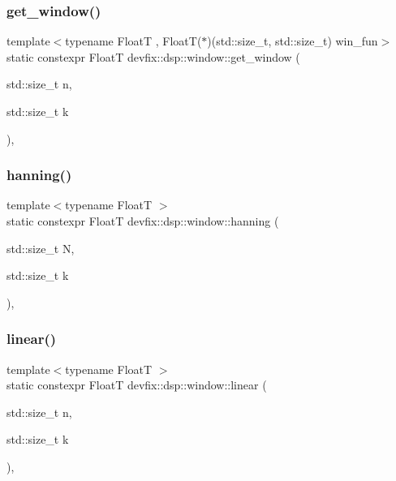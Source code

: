 \subsubsection{\texorpdfstring{get\+\_\+window()}{get\_window()}}
{\footnotesize\ttfamily template$<$typename FloatT , Float\+T($\ast$)(std\+::size\+\_\+t, std\+::size\+\_\+t) win\+\_\+fun$>$ \\
static constexpr FloatT devfix\+::dsp\+::window\+::get\+\_\+window (\begin{DoxyParamCaption}\item[{std\+::size\+\_\+t}]{n,  }\item[{std\+::size\+\_\+t}]{k }\end{DoxyParamCaption})\hspace{0.3cm}{\ttfamily [inline]}, {\ttfamily [static]}}

\mbox{\label{structdevfix_1_1dsp_1_1window_add23aaf0f9936857ad02a9d19b785849}} 
\subsubsection{\texorpdfstring{hanning()}{hanning()}}
{\footnotesize\ttfamily template$<$typename FloatT $>$ \\
static constexpr FloatT devfix\+::dsp\+::window\+::hanning (\begin{DoxyParamCaption}\item[{std\+::size\+\_\+t}]{N,  }\item[{std\+::size\+\_\+t}]{k }\end{DoxyParamCaption})\hspace{0.3cm}{\ttfamily [inline]}, {\ttfamily [static]}}

\mbox{\label{structdevfix_1_1dsp_1_1window_a334a42b01504381fb13459f566aa2025}} 
\subsubsection{\texorpdfstring{linear()}{linear()}}
{\footnotesize\ttfamily template$<$typename FloatT $>$ \\
static constexpr FloatT devfix\+::dsp\+::window\+::linear (\begin{DoxyParamCaption}\item[{std\+::size\+\_\+t}]{n,  }\item[{std\+::size\+\_\+t}]{k }\end{DoxyParamCaption})\hspace{0.3cm}{\ttfamily [inline]}, {\ttfamily [static]}}

